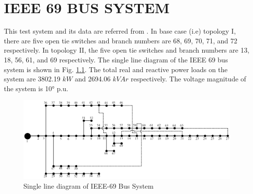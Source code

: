 \chapter{IEEE 69 BUS SYSTEM}
This test system and its data are referred from \cite{69bus}. In base case (i.e) topology I, there are five open tie switches and branch numbers are 68, 69, 70, 71, and 72 respectively. In topology II, the five open tie switches and branch numbers are 13, 18, 56, 61, and 69 respectively. The single line diagram of the IEEE 69 bus system is shown in Fig. \ref{fig:single69}. The total real and reactive power loads on the system are 3802.19 $kW$ and 2694.06 $kVAr$ respectively. The voltage magnitude of the system is 1\angle\ang{0} p.u.
\begin{figure}[ht]
	\includegraphics[width=1\textwidth]{./Figures/69bus_singleline_diagram_tieline_t1}
	\caption{Single line diagram of IEEE-69 Bus System}
	\label{fig:single69}
\end{figure}
\pagebreak
